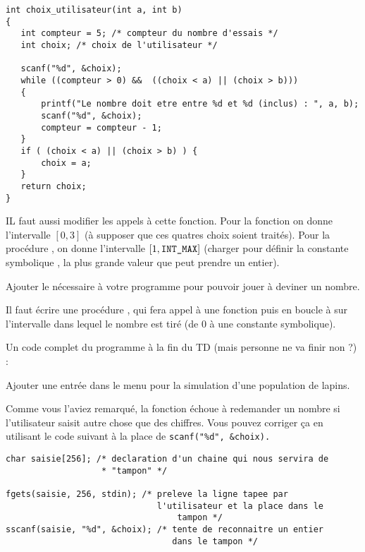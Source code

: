 \begin{lastenu}
    \begin{correction}
{\footnotesize
\begin{verbatim}
int choix_utilisateur(int a, int b)
{
   int compteur = 5; /* compteur du nombre d'essais */
   int choix; /* choix de l'utilisateur */

   scanf("%d", &choix);
   while ((compteur > 0) &&  ((choix < a) || (choix > b)))
   {
       printf("Le nombre doit etre entre %d et %d (inclus) : ", a, b);
       scanf("%d", &choix);
       compteur = compteur - 1;
   }
   if ( (choix < a) || (choix > b) ) {
       choix = a;
   }
   return choix;
}
\end{verbatim}
}
IL faut aussi modifier les appels à cette fonction. Pour la fonction
 on donne l'intervalle $[0, 3]$ (à supposer que
ces quatres choix soient traités). Pour la procédure
, on donne l'intervalle $[1, \text{{\upshape\texttt{INT\_MAX}}}]$
(charger  pour définir la constante symbolique , la plus grande valeur que
peut prendre un entier).
    \end{correction}
\item Ajouter le nécessaire à votre programme pour pouvoir jouer à
  deviner un nombre.
\begin{correction}
Il faut écrire une procédure , qui fera appel à une fonction  puis en boucle à  sur l'intervalle dans lequel le nombre est tiré (de 0 à une constante symbolique).

Un code complet du programme à la fin du TD (mais personne ne va finir non ?) :
{\footnotesize
{}
}
\end{correction}
\item Ajouter une entrée dans le menu pour la simulation d'une
  population de lapins.
\item Comme vous l'aviez remarqué, la fonction 
  échoue à redemander un nombre si l'utilisateur saisit autre chose
  que des chiffres.  Vous pouvez corriger ça en utilisant le code
  suivant à la place de \verb+scanf("%d", &choix).+
{\small
\begin{verbatim}
char saisie[256]; /* declaration d'un chaine qui nous servira de
                   * "tampon" */

fgets(saisie, 256, stdin); /* preleve la ligne tapee par
                              l'utilisateur et la place dans le
                                  tampon */
sscanf(saisie, "%d", &choix); /* tente de reconnaitre un entier
                                 dans le tampon */
\end{verbatim}
}


\end{lastenu}
